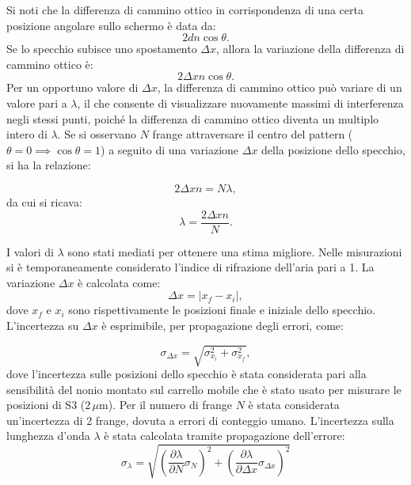 \documentclass[a4paper,12pt]{article}
\begin{document}
Si noti che la differenza di cammino ottico in corrispondenza di una certa posizione angolare sullo schermo è data da:
\begin{equation}
2d n \cos\theta.
\end{equation}
Se lo specchio subisce uno spostamento \( \Delta x \), allora la variazione della differenza di cammino ottico è:
\begin{equation}
2\Delta x n \cos\theta.
\label{eq:variazione_cammino}
\end{equation}
Per un opportuno valore di \( \Delta x \), la differenza di cammino ottico può variare di un valore pari a \( \lambda \), il che consente di visualizzare nuovamente massimi di interferenza negli stessi punti, poiché la differenza di cammino ottico diventa un multiplo intero di \( \lambda \).
Se si osservano \( N \) frange attraversare il centro del pattern (\( \theta = 0 \implies \cos\theta = 1 \)) a seguito di una variazione \( \Delta x \) della posizione dello specchio, si ha la relazione:

\begin{equation}
2\Delta x n = N\lambda,
\label{eq:frange_interferenza}
\end{equation}
da cui si ricava:
\begin{equation}
\lambda = \frac{2\Delta x n}{N}.
\label{eq:calcolo_lambda}
\end{equation}

I valori di \( \lambda \) sono stati mediati per ottenere una stima migliore. Nelle misurazioni si è temporaneamente considerato l’indice di rifrazione dell’aria pari a 1.
La variazione \( \Delta x \) è calcolata come:
\begin{equation}
\Delta x = |x_f - x_i|,
\end{equation}
dove \( x_f \) e \( x_i \) sono rispettivamente le posizioni finale e iniziale dello specchio. L’incertezza su \( \Delta x \) è esprimibile, per propagazione degli errori, come:

\begin{equation}
\sigma_{\Delta x} = \sqrt{\sigma_{x_i}^2 + \sigma_{x_f}^2},
\label{eq:incertezza_delta_x}
\end{equation}
dove l’incertezza sulle posizioni dello specchio è stata considerata pari alla sensibilità del nonio montato sul carrello mobile che è stato usato per misurare le posizioni di S3 (\( 2 \, \mu\text{m} \)). Per il numero di frange \( N \) è stata considerata un’incertezza di 2 frange, dovuta a errori di conteggio umano. L’incertezza sulla lunghezza d’onda \( \lambda \) è stata calcolata tramite propagazione dell’errore:
\begin{equation}
    \sigma_{\lambda} = \sqrt{\left(\frac{\partial \lambda}{\partial N} \sigma_N\right)^2 + \left(\frac{\partial \lambda}{\partial \Delta x} \sigma_{\Delta x}\right)^2}
    \label{eq:incertezza_lambda}
\end{equation}
\end{document}
